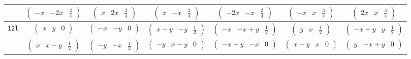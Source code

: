\documentclass[fleqn,9pt,landscape]{jsarticle}
\begin{document}
\begin{center}
\begin{longtable}{ccccccc}
& $ \begin{pmatrix} - x & - 2 x & \frac{3}{4} \end{pmatrix} $ & $ \begin{pmatrix} x & 2 x & \frac{3}{4} \end{pmatrix} $ & $ \begin{pmatrix} x & - x & \frac{3}{4} \end{pmatrix} $ & $ \begin{pmatrix} - 2 x & - x & \frac{3}{4} \end{pmatrix} $ & $ \begin{pmatrix} - x & x & \frac{3}{4} \end{pmatrix} $ & $ \begin{pmatrix} 2 x & x & \frac{3}{4} \end{pmatrix} $ \\ \hline
{\tt 12l} & $ \begin{pmatrix} x & y & 0 \end{pmatrix} $ & $ \begin{pmatrix} - x & - y & 0 \end{pmatrix} $ & $ \begin{pmatrix} x - y & - y & \frac{1}{2} \end{pmatrix} $ & $ \begin{pmatrix} - x & - x + y & \frac{1}{2} \end{pmatrix} $ & $ \begin{pmatrix} y & x & \frac{1}{2} \end{pmatrix} $ & $ \begin{pmatrix} - x + y & y & \frac{1}{2} \end{pmatrix} $ \\
& $ \begin{pmatrix} x & x - y & \frac{1}{2} \end{pmatrix} $ & $ \begin{pmatrix} - y & - x & \frac{1}{2} \end{pmatrix} $ & $ \begin{pmatrix} - y & x - y & 0 \end{pmatrix} $ & $ \begin{pmatrix} - x + y & - x & 0 \end{pmatrix} $ & $ \begin{pmatrix} x - y & x & 0 \end{pmatrix} $ & $ \begin{pmatrix} y & - x + y & 0 \end{pmatrix} $ \\ \hline

\end{longtable}
\end{center}
\end{document}
